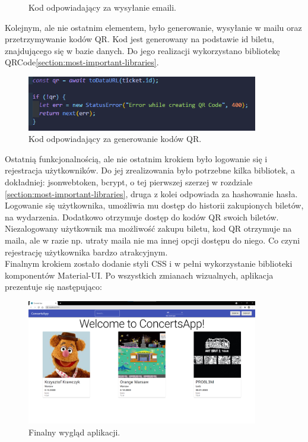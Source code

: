 \documentclass[12pt]{article}
\begin{document}
\begin{sloppypar}
{\begin{figure}[H]
    \caption{Kod odpowiadający za wysyłanie emaili.}
    \label{fig:sending-email}
  \end{figure}
  Kolejnym, ale nie ostatnim elementem, było generowanie, wysyłanie w mailu oraz przetrzymywanie kodów QR. 
  Kod jest generowany na podstawie id biletu, znajdującego się w bazie danych. 
  Do jego realizacji wykorzystano bibliotekę QRCode\ref{section:most-important-libraries}.
  \begin{figure}[H]
    \centering
    \includegraphics[width=0.9\textwidth]{Creation_process/qrcode.PNG}
    \caption{Kod odpowiadający za generowanie kodów QR.}
    \label{fig:qr-code}
  \end{figure}
  Ostatnią funkcjonalnością, ale nie ostatnim krokiem było logowanie się i rejestracja użytkowników. 
  Do jej zrealizowania było potrzebne kilka bibliotek, a dokładniej: jsonwebtoken, bcrypt, o tej pierwszej szerzej w rozdziale \ref{section:most-important-libraries}, 
  druga z kolei odpowiada za hashowanie hasła.
  Logowanie się użytkownika, umożliwia mu dostęp do historii zakupionych biletów, na wydarzenia. Dodatkowo otrzymuje dostęp do kodów QR swoich biletów. 
  Niezalogowany użytkownik ma możliwość zakupu biletu, kod QR otrzymuje na maila, ale w razie np. utraty maila nie ma innej opcji dostępu do niego. 
  Co czyni rejestrację użytkownika bardzo atrakcyjnym.\\
  Finalnym krokiem zostało dodanie styli CSS i w pełni wykorzystanie biblioteki komponentów Material-UI. 
  Po wszystkich zmianach wizualnych, aplikacja prezentuje się następująco:
  \begin{figure}[H]
    \centering
    \includegraphics[width=0.9\textwidth]{client_app/home.png}
    \caption{Finalny wygląd aplikacji.}
    \label{fig:final-view}
  \end{figure}
}


\end{sloppypar}
\end{document}
